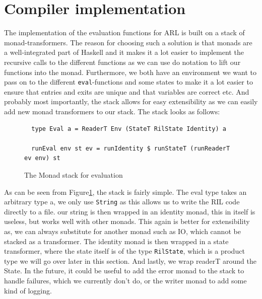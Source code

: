 \documentclass[a4paper]{article}
\begin{document}
\section{Compiler implementation}
\label{compiler}
The implementation of the evaluation functions for ARL is built on a stack of monad-transformers. The reason for choosing such a solution is that monads are a well-integrated part of Haskell and it makes it a lot easier to implement the recursive calls to the different functions as we can use do notation to lift our functions into the monad. Furthermore, we both have an environment we want to pass on to the different \texttt{eval}-functions and some states to make it a lot easier to ensure that entries and exits are unique and that variables are correct etc. And probably most importantly, the stack allows for easy extensibility as we can easily add new monad transformers to our stack. The stack looks as follows:

\begin{figure}[!htb]
\begin{lstlisting}
  type Eval a = ReaderT Env (StateT RilState Identity) a

  runEval env st ev = runIdentity $ runStateT (runReaderT ev env) st
\end{lstlisting}
\caption{The Monad stack for evaluation}
\label{stack}
\end{figure}

As can be seen from Figure\ref{stack}, the stack is fairly simple. The eval type takes an arbitrary type a, we only use \texttt{String} as this allows us to write the RIL code directly to a file. our string is then wrapped in an identity monad, this in itself is useless, but works well with other monads. This again is better for extensibility as, we can always substitute for another monad such as IO, which cannot be stacked as a transformer. The identity monad is then wrapped in a state transformer, where the state itself is of the type \texttt{RilState}, which is a product type we will go over later in this section. And lastly, we wrap readerT around the State. In the future, it could be useful to add the error monad to the stack to handle failures, which we currently don't do, or the writer monad to add some kind of logging.
\end{document}
